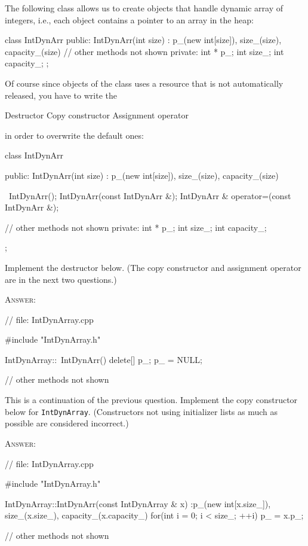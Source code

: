 \newpage
\nextq
The following class allows us to create objects that handle dynamic array of
integers, i.e., each object contains a pointer to an array in the heap:
\begin{console}[fontsize=\small]
class IntDynArr
{
public:
    IntDynArr(int size)
        : p_(new int[size]), size_(size), capacity_(size)
    {}
    // other methods not shown
private:
    int * p_;
    int size_;
    int capacity_;
};
\end{console}
Of course since objects of the class uses a resource that is not automatically
released, you have to write the
\begin{enumerate}[nosep]
\li Destructor
\li Copy constructor
\li Assignment operator
\end{enumerate}
in order to overwrite the default ones:
\begin{console}[fontsize=\small]
class IntDynArr
{
public:
    IntDynArr(int size)
        : p_(new int[size]), size_(size), capacity_(size)
    {}

    ~IntDynArr();
    IntDynArr(const IntDynArr &);
    IntDynArr & operator=(const IntDynArr &);

    // other methods not shown
private:
    int * p_;
    int size_;
    int capacity_;
};
\end{console}

Implement the destructor below.
(The copy constructor and assignment operator are in the next two
questions.)

\textsc{Answer:}
\begin{answercode}
// file: IntDynArray.cpp

#include "IntDynArray.h"

IntDynArray::~IntDynArr()
{
    delete[] p_;
    p_ = NULL;
}

// other methods not shown
\end{answercode}


\newpage
\nextq
This is a continuation of the previous question.
Implement the copy constructor below for \verb!IntDynArray!.
(Constructors not using initializer lists as much as possible are considered
incorrect.)

\textsc{Answer:}
\begin{answercode}
// file: IntDynArray.cpp

#include "IntDynArray.h"

IntDynArray::IntDynArr(const IntDynArray & x)
    :p_(new int[x.size_]), size_(x.size_), capacity_(x.capacity_)
{
    for(int i = 0; i < size_; ++i)
    {
        p_ = x.p_;
    }
}

// other methods not shown
\end{answercode}



